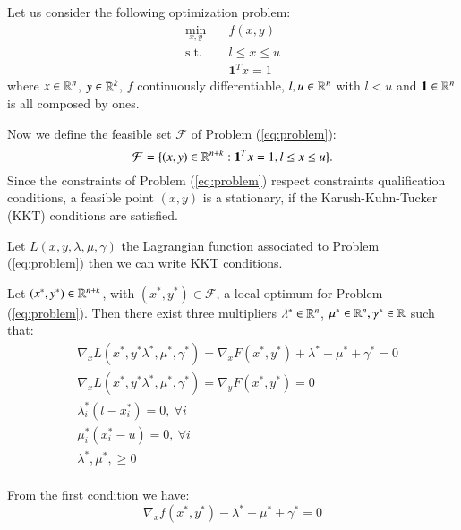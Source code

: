 Let us consider the following optimization problem:
\begin{subequations}\label{eq:problem} 
\begin{align}
\min_{x,y} & \quad f(x,y)  \\
\text{s.t.} & \quad l \leq x \leq u \\
& \quad \mathbf{1}^T x = 1 
\end{align}
\end{subequations}
where $x \in \mathbb{R}^n$, $y \in \mathbb{R}^k$, $f$ continuously differentiable, $l, u \in \mathbb{R}^n$ with $l < u$ and $\mathbf{1} \in \mathbb{R}^n$ is all composed by ones. 

Now we define the feasible set $\mathcal{F}$  of Problem (\ref{eq:problem}):
\begin{equation}
\mathcal{F} = \{(x,y) \in \mathbb{R}^{n+k} : \mathbf{1}^T x = 1, l \leq x \leq u\}.
\end{equation}
Since the constraints of Problem (\ref{eq:problem}) respect constraints qualification conditions, a feasible point $(x,y)$ is a stationary, if the Karush-Kuhn-Tucker (KKT) conditions are satisfied.

Let $L(x,y,\lambda,\mu,\gamma)$ the Lagrangian function associated to Problem (\ref{eq:problem}) then we can write KKT conditions.

\begin{proposition}\label{prop:KKT}

Let $(x^*,y^*) \in \mathbb{R}^{n+k}$, with $(x^*,y^*) \in \mathcal{F}$, a local optimum for Problem (\ref{eq:problem}). Then there exist three multipliers $\lambda^* \in \mathbb{R}^n$, $\mu^* \in \mathbb{R}^n, \gamma^* \in \mathbb{R}$ such that:
\begin{equation}
 \begin{aligned}
  &\nabla_x L(x^*,y^*\lambda^*,\mu^*,\gamma^*)= \nabla_x F(x^*,y^*)+\lambda^*-\mu^*+\gamma^*=0\\
 &\nabla_x L(x^*,y^*\lambda^*,\mu^*,\gamma^*)=\nabla_y F(x^*,y^*) =0 \\
    &\lambda^*_i(l-x_i^*)=0,\ \forall i\\
 &\mu^*_i(x_i^*-u)=0,\ \forall i\\
   & \lambda^*,\mu^*,\ge0 \\
 \end{aligned}
\end{equation}
\end{proposition}

From the first condition we have:
\begin{equation}
 \nabla_x f(x^*,y^*)-\lambda^*+\mu^*+\gamma^*=0
\end{equation}

